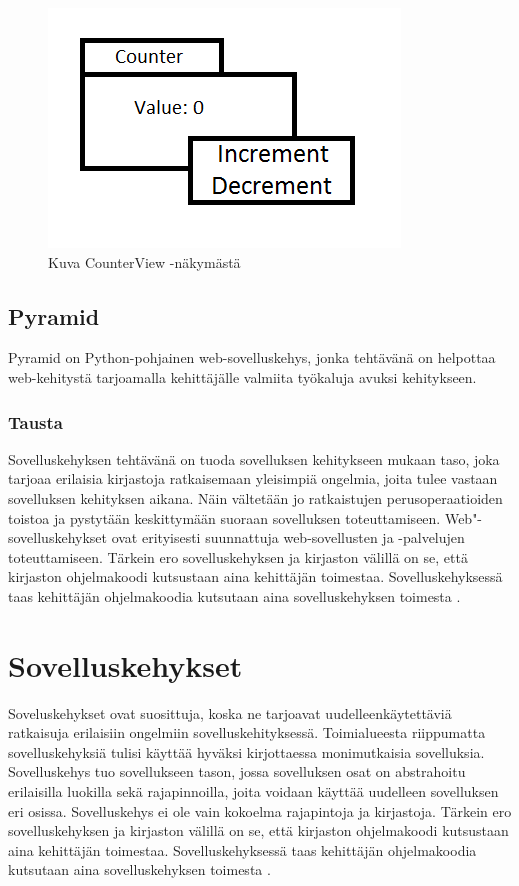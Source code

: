\documentclass[utf8]{gradu3}
\begin{document}
\begin{figure}[h]
\centering
\includegraphics[scale=0.85]{counter.png}
\caption{Kuva CounterView -näkymästä \cite{krasner_desc}}
\end{figure}

\section{Pyramid}
Pyramid on Python-pohjainen web-sovelluskehys, jonka tehtävänä on helpottaa web-kehitystä tarjoamalla
kehittäjälle valmiita työkaluja avuksi kehitykseen.

\subsection{Tausta}
Sovelluskehyksen tehtävänä on tuoda sovelluksen kehitykseen mukaan
taso, joka tarjoaa erilaisia kirjastoja ratkaisemaan yleisimpiä ongelmia, joita tulee vastaan sovelluksen kehityksen aikana. Näin vältetään
jo ratkaistujen perusoperaatioiden toistoa ja pystytään keskittymään suoraan sovelluksen toteuttamiseen. Web"-sovelluskehykset ovat erityisesti suunnattuja
web-sovellusten ja -palvelujen toteuttamiseen.  Tärkein ero sovelluskehyksen ja kirjaston välillä on se, että kirjaston ohjelmakoodi kutsustaan aina
kehittäjän toimestaa. Sovelluskehyksessä taas kehittäjän ohjelmakoodia kutsutaan aina sovelluskehyksen toimesta \cite{Pyramid:intr}.

\chapter{Sovelluskehykset}
Soveluskehykset ovat suosittuja, koska ne tarjoavat uudelleenkäytettäviä ratkaisuja erilaisiin ongelmiin sovelluskehityksessä. Toimialueesta riippumatta sovelluskehyksiä tulisi käyttää hyväksi kirjottaessa monimutkaisia sovelluksia. Sovelluskehys tuo sovellukseen tason, jossa sovelluksen osat on abstrahoitu erilaisilla luokilla sekä rajapinnoilla, joita voidaan käyttää uudelleen sovelluksen eri osissa. Sovelluskehys ei ole vain kokoelma rajapintoja ja kirjastoja\parencite{towards_framework}. Tärkein ero sovelluskehyksen ja kirjaston välillä on se, että kirjaston ohjelmakoodi kutsustaan aina
kehittäjän toimestaa. Sovelluskehyksessä taas kehittäjän ohjelmakoodia kutsutaan aina sovelluskehyksen toimesta \parencite{pyramid_intr}.
\end{document}
